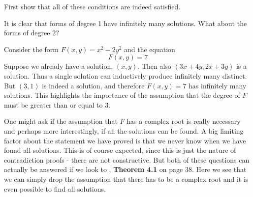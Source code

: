 \documentclass{article}
\begin{document}
First show that all of these conditions are indeed satisfied. 



It is clear that forms of degree 1 have infinitely many solutions. What about the forms of degree 2?

Consider the form $F(x,y) = x^2 - 2y^2$ and the equation 
$$F(x, y) = 7$$
Suppose we already have a solution, $(x,y)$. Then also $(3x + 4y, 2x + 3y)$ is a solution. Thus a single solution can inductively produce infinitely many distinct. But $(3,1)$ is indeed a solution, and therefore $F(x, y) = 7$ has infinitely many solutions. This highlights the importance of the assumption that the degree of $F$ must be greater than or equal to 3.   


One might ask if the assumption that $F$ has a complex root is really necessary and perhaps more interestingly, if all the solutions can be found. A big limiting factor about the statement we have proved is that we never know when we have found all solutions. This is of course expected, since this is just the nature of contradiction proofs - there are not constructive. But both of these questions can actually be answered if we look to \cite{baker}, \textbf{Theorem 4.1} on page 38. Here we see that we can simply drop the assumption that there has to be a complex root and it is even possible to find all solutions.


\end{document}
